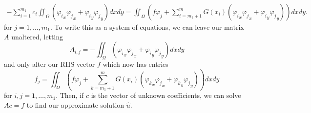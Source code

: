 \documentclass{article}
\begin{document}
\begin{align*}
-\sum_{i=1}^{m_1} c_i\iint_\Omega\left({\varphi_i}_x{\varphi_j}_x+{\varphi_i}_y{\varphi_j}_y\right)dxdy=\iint_\Omega \left(f\varphi_j+\sum_{i=m_1+1}^mG(x_i)\left({\varphi_i}_x{\varphi_j}_x+{\varphi_i}_y{\varphi_j}_y\right)\right)dxdy.
\end{align*}
for $j=1,\ldots,m_1$. To write this as a system of equations, we can leave our matrix $A$ unaltered, letting
\[
A_{i,j}=-\iint_\Omega\left({\varphi_i}_x{\varphi_j}_x+{\varphi_i}_y{\varphi_j}_y\right)dxdy
\]
and only alter our RHS vector $f$ which now has entries
\[
f_j=\iint_\Omega \left(f\varphi_j+\sum_{k=m_1+1}^mG(x_i)\left({\varphi_k}_x{\varphi_j}_x+{\varphi_k}_y{\varphi_j}_y\right)\right)dxdy
\]
for $i,j=1,\ldots,m_1$. Then, if $c$ is the vector of unknown coefficients, we can solve $Ac=f$ to find our approximate solution $
\hat{u}$.
\end{document}
